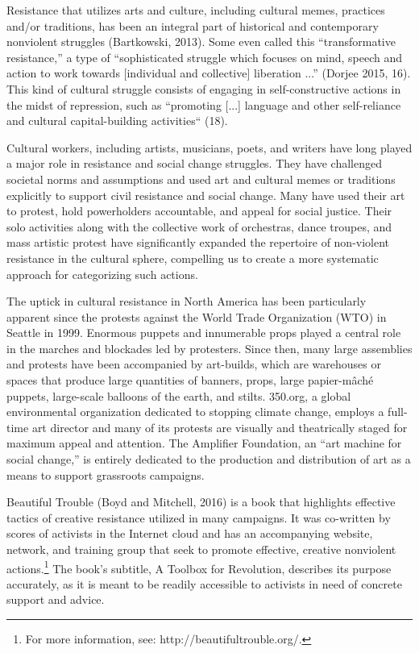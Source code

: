 \documentclass[twoside,a4paper,12pt,fleqn,openany]{extbook}
\begin{document}
Resistance that utilizes arts and culture, including cultural memes, practices and/or traditions, has been an integral part of historical and contemporary nonviolent struggles (Bartkowski, 2013). Some even called this “transformative resistance,” a type of “sophisticated struggle which focuses on mind, speech and action to work towards [individual and collective] liberation ...” (Dorjee 2015, 16). This kind of cultural struggle consists of engaging in self-constructive actions in the midst of repression, such as “promoting [...] language and other self-reliance and cultural capital-building activities“ (18).

Cultural workers, including artists, musicians, poets, and writers have long played a major role in resistance and social change struggles. They have challenged societal norms and assumptions and used art and cultural memes or traditions explicitly to support civil resistance and social change. Many have used their art to protest, hold powerholders accountable, and appeal for social justice. Their solo activities along with the collective work of orchestras, dance troupes, and mass artistic protest have significantly expanded the repertoire of non-violent resistance in the cultural sphere, compelling us to create a more systematic approach for categorizing such actions.

The uptick in cultural resistance in North America has been particularly apparent since the protests against the World Trade Organization (WTO) in Seattle in 1999. Enormous puppets and innumerable props played a central role in the marches and blockades led by protesters. Since then, many large assemblies and protests have been accompanied by art-builds, which are warehouses or spaces that produce large quantities of banners, props, large papier-mâché puppets, large-scale balloons of the earth, and stilts. 350.org, a global environmental organization dedicated to stopping climate change, employs a full-time art director and many of its protests are visually and theatrically staged for maximum appeal and attention. The Amplifier Foundation, an “art machine for social change,” is entirely dedicated to the production and distribution of art as a means to support grassroots campaigns.

Beautiful Trouble (Boyd and Mitchell, 2016) is a book that highlights effective tactics of creative resistance utilized in many campaigns. It was co-written by scores of activists in the Internet cloud and has an accompanying website, network, and training group that seek to promote effective, creative nonviolent actions.\footnote{For more information, see: http://beautifultrouble.org/.} The book’s subtitle, A Toolbox for Revolution, describes its purpose accurately, as it is meant to be readily accessible to activists in need of concrete support and advice.
\end{document}
